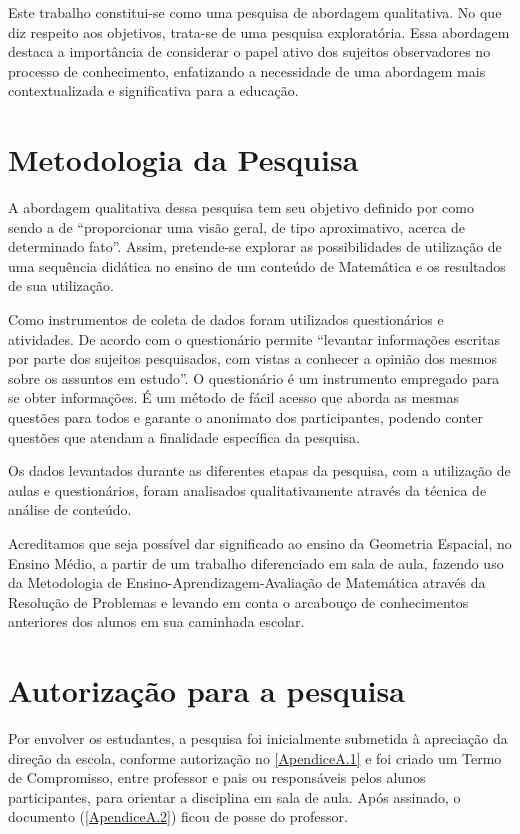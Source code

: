 Este trabalho constitui-se como uma pesquisa de abordagem qualitativa. No que diz respeito aos objetivos, trata-se de uma pesquisa exploratória. Essa abordagem destaca a importância de considerar o papel ativo dos sujeitos observadores no processo de conhecimento, enfatizando a necessidade de uma abordagem mais contextualizada e significativa para a educação.

\section{Metodologia da Pesquisa}

A abordagem qualitativa dessa pesquisa tem seu objetivo definido por  como sendo a de ``proporcionar uma visão geral, de tipo aproximativo, acerca de determinado fato''. Assim, pretende-se explorar as possibilidades de utilização de uma sequência didática no ensino de um conteúdo de Matemática e os resultados de sua utilização.

Como instrumentos de coleta de dados foram utilizados questionários e atividades. De acordo com  o questionário permite ``levantar informações escritas por parte dos sujeitos pesquisados, com vistas a conhecer a opinião dos mesmos sobre os assuntos em estudo''. O questionário é um instrumento empregado para se obter informações. É um método de fácil acesso que aborda as mesmas questões para todos e garante o anonimato dos participantes, podendo conter questões que atendam a finalidade específica da pesquisa.

Os dados levantados durante as diferentes etapas da pesquisa, com a utilização de aulas e questionários, foram analisados qualitativamente através da técnica de análise de conteúdo.

Acreditamos que seja possível dar significado ao ensino da Geometria Espacial, no Ensino Médio, a partir de um trabalho diferenciado em sala de aula, fazendo uso da Metodologia de Ensino-Aprendizagem-Avaliação de Matemática através da Resolução de Problemas e levando em conta o arcabouço de  conhecimentos anteriores dos alunos em sua caminhada escolar.

\section{Autorização para a pesquisa}

Por envolver os estudantes, a pesquisa foi inicialmente submetida à apreciação da direção da escola, conforme autorização no \autoref{ApendiceA.1} e foi criado um Termo de Compromisso, entre professor e pais ou responsáveis pelos alunos participantes, para orientar a disciplina em sala de aula. Após assinado, o documento (\autoref{ApendiceA.2}) ficou de posse do professor.

